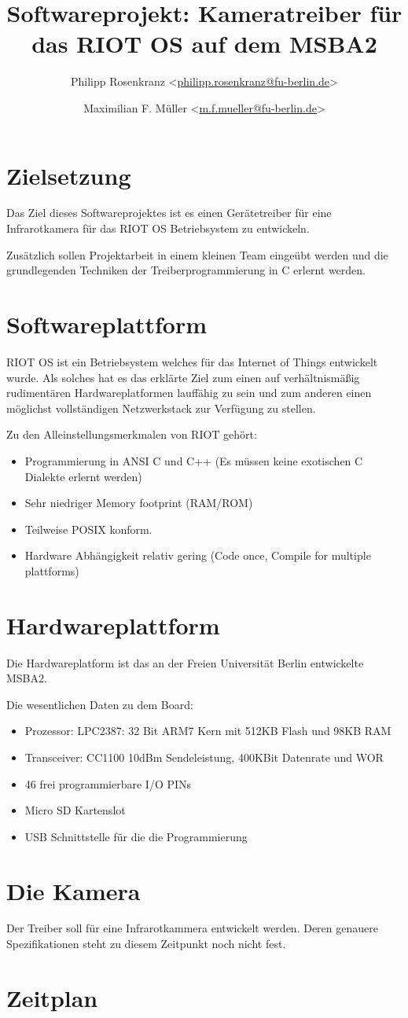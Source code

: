 \documentclass[10pt,a4paper]{article}
\title{Softwareprojekt: Kameratreiber für das RIOT OS auf dem MSBA2}
\author{Philipp Rosenkranz  \textless\href{mailto:philipp.rosenkranz@fu-berlin.de}{philipp.rosenkranz@fu-berlin.de}\textgreater
        \and Maximilian F. Müller \textless\href{mailto:m.f.mueller@fu-berlin.de}{m.f.mueller@fu-berlin.de}\textgreater}
\begin{document}
\maketitle

\section{Zielsetzung}

Das Ziel dieses Softwareprojektes ist es einen Gerätetreiber für eine Infrarotkamera für das
RIOT OS Betriebsystem zu entwickeln.

Zusätzlich sollen Projektarbeit in einem kleinen Team eingeübt werden und die grundlegenden Techniken der Treiberprogrammierung in C erlernt werden.
\section{Softwareplattform}
RIOT OS ist ein Betriebsystem welches für das Internet of Things entwickelt wurde.
Als solches hat es das erklärte Ziel zum einen auf verhältnismäßig rudimentären Hardwareplatformen lauffähig zu sein und zum anderen einen möglichst vollständigen Netzwerkstack zur Verfügung zu stellen.

Zu den Alleinstellungsmerkmalen von RIOT gehört:
\begin{itemize}
\item Programmierung in ANSI C und C++ (Es müssen keine exotischen C Dialekte erlernt werden)
\item Sehr niedriger Memory footprint (RAM/ROM)
\item Teilweise POSIX konform.
\item Hardware Abhängigkeit relativ gering (Code once, Compile for multiple plattforms)
\end{itemize}

\section{Hardwareplattform}
Die Hardwareplatform ist das an der Freien Universität Berlin entwickelte \mbox{MSBA2}. 

Die wesentlichen Daten zu dem Board:

\begin{itemize}
\item Prozessor: LPC2387: 32 Bit ARM7 Kern mit 512KB Flash und 98KB RAM
\item Transceiver: CC1100 10dBm Sendeleistung, 400KBit Datenrate und WOR 
\item 46 frei programmierbare I/O PINs
\item Micro SD Kartenslot 
\item USB Schnittstelle für die die Programmierung 

\end{itemize}

\section{Die Kamera}
Der Treiber soll für eine Infrarotkammera entwickelt werden. Deren genauere Spezifikationen steht zu diesem Zeitpunkt noch nicht fest.

\section{Zeitplan}
\end{document}
